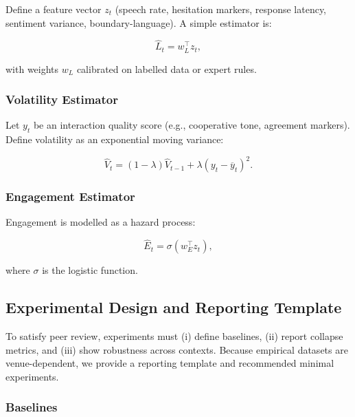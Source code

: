 Define a feature vector $z_t$ (speech rate, hesitation markers,
response latency, sentiment variance, boundary-language). A simple
estimator is:

\begin{equation}
\widehat{L}_t = w_L^\top z_t,
\label{eq:pp-load-estimator}
\end{equation}

\noindent
with weights $w_L$ calibrated on labelled data or expert rules.

\subsubsection{Volatility Estimator}
\label{sec:pp-volatility-estimator}

Let $y_t$ be an interaction quality score (e.g., cooperative tone,
agreement markers). Define volatility as an exponential moving
variance:

\begin{equation}
\widehat{V}_t = (1 - \lambda) \widehat{V}_{t-1} +
\lambda (y_t - \overline{y}_t)^2.
\label{eq:pp-volatility-estimator}
\end{equation}

\subsubsection{Engagement Estimator}
\label{sec:pp-engagement-estimator}

Engagement is modelled as a hazard process:

\begin{equation}
\widehat{E}_t = \sigma(w_E^\top z_t),
\label{eq:pp-engagement-estimator}
\end{equation}

\noindent
where $\sigma$ is the logistic function.

\subsection{Experimental Design and Reporting Template}
\label{sec:pp-experimental-design}

To satisfy peer review, experiments must (i) define baselines, (ii)
report collapse metrics, and (iii) show robustness across contexts.
Because empirical datasets are venue-dependent, we provide a
reporting template and recommended minimal experiments.

\subsubsection{Baselines}
\label{sec:pp-baselines}

